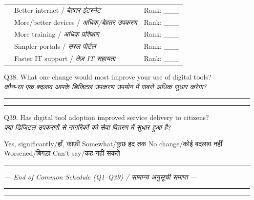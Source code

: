 \documentclass[10pt,a4paper]{article}
\begin{document}
\noindent\begin{tabularx}{\textwidth}{@{}L{0.8cm} X L{1.5cm}@{}}
 & Better internet / {\hindifont\small\itshape\color{black!70} बेहतर इंटरनेट} & Rank: \_\_\_ \\[3pt]
 & More/better devices / {\hindifont\small\itshape\color{black!70} अधिक/बेहतर उपकरण} & Rank: \_\_\_ \\[3pt]
 & More training / {\hindifont\small\itshape\color{black!70} अधिक प्रशिक्षण} & Rank: \_\_\_ \\[3pt]
 & Simpler portals / {\hindifont\small\itshape\color{black!70} सरल पोर्टल} & Rank: \_\_\_ \\[3pt]
 & Faster IT support / {\hindifont\small\itshape\color{black!70} तेज़ IT सहायता} & Rank: \_\_\_ \\[3pt]
\end{tabularx}
\vspace{4pt}
\noindent Q38. What one change would most improve your use of digital tools?\\
{\hindifont\small\itshape\color{black!70} कौन-सा एक बदलाव आपके डिजिटल उपकरण उपयोग में सबसे अधिक सुधार करेगा?}\vspace{3pt}

\noindent\rule{\textwidth}{0.4pt}\vspace{4pt}
\noindent\rule{\textwidth}{0.4pt}\vspace{4pt}
\noindent Q39. Has digital tool adoption improved service delivery to citizens?\\
{\hindifont\small\itshape\color{black!70} क्या डिजिटल उपकरणों से नागरिकों को सेवा वितरण में सुधार हुआ है?}\vspace{2pt}

\noindent {\Large$\square$} Yes, significantly/{\hindifont हाँ, काफ़ी}\quad{\Large$\square$} Somewhat/{\hindifont कुछ हद तक}\quad{\Large$\square$} No change/{\hindifont कोई बदलाव नहीं}\quad{\Large$\square$} Worsened/{\hindifont बिगड़ा}\quad{\Large$\square$} Can't say/{\hindifont कह नहीं सकते}

\vspace{4pt}\noindent\rule{\textwidth}{1pt}\vspace{2pt}
\begin{center}\textit{--- End of Common Schedule (Q1--Q39) / {\hindifont सामान्य अनुसूची समाप्त} ---}\end{center}
\rule{\textwidth}{0.5pt}
\newpage
\noindent\rule{\textwidth}{0.3pt}\vspace{3pt}
\vspace{3pt}
\end{document}

